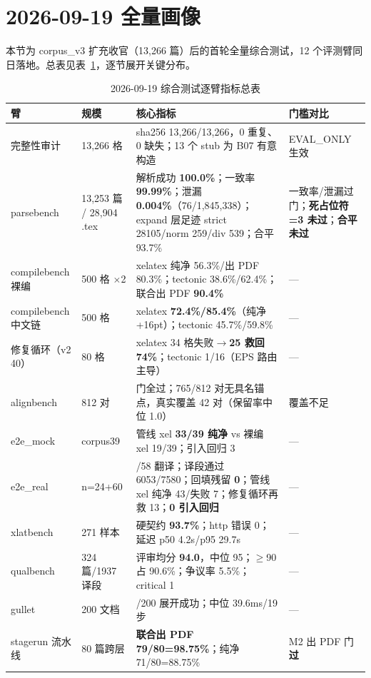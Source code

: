 \section{2026-09-19 全量画像}

本节为 corpus\_v3 扩充收官（13{,}266 篇）后的首轮全量综合测试，12 个评测臂同日落地。总表见表~\ref{tab:snapshot}，逐节展开关键分布。

\begin{table}[htbp]
\centering\scriptsize
\caption{2026-09-19 综合测试逐臂指标总表}
\label{tab:snapshot}
\setlength{\tabcolsep}{4pt}
\begin{tabular}{@{}ll>{\raggedright\arraybackslash}p{6.4cm}>{\raggedright\arraybackslash}p{3.0cm}@{}}
\toprule
臂 & 规模 & 核心指标 & 门槛对比 \\
\midrule
完整性审计 & 13{,}266 格 & sha256 13{,}266/13{,}266，0 重复、0 缺失；13 个 stub 为 B07 有意构造 & EVAL\_ONLY 生效 \\
parsebench & 13{,}253 篇 / 28{,}904 .tex & 解析成功 \textbf{100.0\%}；一致率 \textbf{99.99\%}；泄漏 \textbf{0.004\%}（76/1{,}845{,}338）；expand 层足迹 strict 28105/norm 259/div 539；合平 93.7\% & 一致率/泄漏过门；\textbf{死占位符=3 未过}；\textbf{合平未过} \\
compilebench 裸编 & 500 格 $\times$2 & xelatex 纯净 56.3\%/出 PDF 80.3\%；tectonic 38.6\%/62.4\%；联合出 PDF \textbf{90.4\%} & --- \\
compilebench 中文链 & 500 格 & xelatex \textbf{72.4\%/85.4\%}（纯净 +16pt）；tectonic 45.7\%/59.8\% & --- \\
修复循环（v2 40） & 80 格 & xelatex 34 格失败$\to$\textbf{25 救回 74\%}；tectonic 1/16（EPS 路由主导） & --- \\
alignbench & 812 对 & 门全过；765/812 对无具名锚点，真实覆盖 42 对（保留率中位 1.0） & 覆盖不足 \\
e2e\_mock & corpus39 & 管线 xel \textbf{33/39 纯净} vs 裸编 xel 19/39；引入回归 3 & --- \\
e2e\_real & n=24+60 & 58/58 翻译；译段通过 6053/7580；回填残留 \textbf{0}；管线 xel 纯净 43/失败 7；修复循环再救 13；\textbf{0 引入回归} & --- \\
xlatbench & 271 样本 & 硬契约 \textbf{93.7\%}；http 错误 0；延迟 p50 4.2s/p95 29.7s & --- \\
qualbench & 324 篇/1937 译段 & 评审均分 \textbf{94.0}，中位 95；$\geq$90 占 90.6\%；争议率 5.5\%；critical 1 & --- \\
gullet & 200 文档 & 199/200 展开成功；中位 39.6ms/19 步 & --- \\
stagerun 流水线 & 80 篇跨层 & \textbf{联合出 PDF 79/80=98.75\%}；纯净 71/80=88.75\% & M2 出 PDF 门\textbf{过} \\
\bottomrule
\end{tabular}
\end{table}

